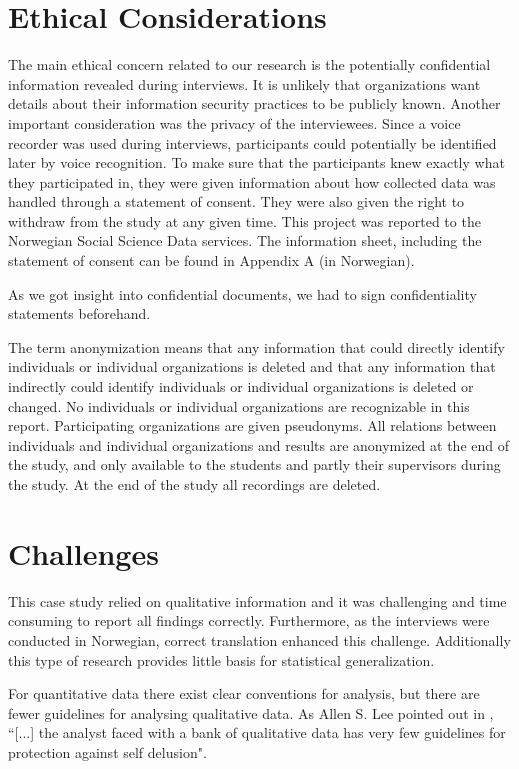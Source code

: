 \section{Ethical Considerations}
\label{sec:ethical}
The main ethical concern related to our research is the potentially confidential information revealed during interviews. It is unlikely that organizations want details about their information security practices to be publicly known. Another important consideration was the privacy of the interviewees. Since a voice recorder was used during interviews, participants could potentially be identified later by voice recognition. To make sure that the participants knew exactly what they participated in, they were given information about how collected data was handled through a statement of consent. They were also given the right to withdraw from the study at any given time. This project was reported to the Norwegian Social Science Data services. The information sheet, including the statement of consent can be found in Appendix A (in Norwegian). 

As we got insight into confidential documents, we had to sign confidentiality statements beforehand.

The term anonymization means that any information that could directly identify individuals or individual organizations is deleted and that any information that indirectly could identify individuals or individual organizations is deleted or changed. No individuals or individual organizations are recognizable in this report. Participating organizations are given pseudonyms. All relations between individuals and individual organizations and results are anonymized at the end of the study, and only available to the students and partly their supervisors during the study. At the end of the study all recordings are deleted.

\section{Challenges}
\label{sec:challenges}
This case study relied on qualitative information and it was challenging and time consuming to report all findings correctly. Furthermore, as the interviews were conducted in Norwegian, correct translation enhanced this challenge. Additionally this type of research provides little basis for statistical generalization. \cite{CaseStudyResearch}

For quantitative data there exist clear conventions for analysis, but there are fewer guidelines for analysing qualitative data. As Allen S. Lee pointed out in \cite{lee1989scientific}, ``[...] the analyst faced with a bank of qualitative data has very few guidelines for protection against self delusion".

